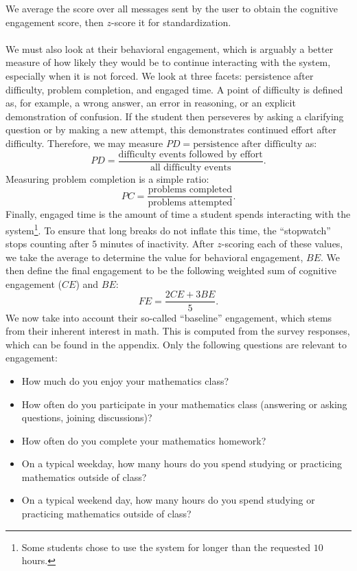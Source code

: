 \documentclass[12pt]{article}
\begin{document}
We average the score over all messages sent by the user to obtain the cognitive engagement score, then $z$-score it for standardization.
\\\\
We must also look at their behavioral engagement, which is arguably a better measure of how likely they would be to continue interacting with the system, especially when it is not forced. We look at three facets: persistence after difficulty, problem completion, and engaged time. A point of difficulty is defined as, for example, a wrong answer, an error in reasoning, or an explicit demonstration of confusion. If the student then perseveres by asking a clarifying question or by making a new attempt, this demonstrates continued effort after difficulty. Therefore, we may measure $PD = \text{persistence after difficulty}$ as:
\[PD = \frac{\text{difficulty events followed by effort}}{\text{all difficulty events}}.\]
Measuring problem completion is a simple ratio:
\[PC = \frac{\text{problems completed}}{\text{problems attempted}}.\]
Finally, engaged time is the amount of time a student spends interacting with the system\footnote{Some students chose to use the system for longer than the requested $10$ hours.}. To ensure that long breaks do not inflate this time, the ``stopwatch'' stops counting after $5$ minutes of inactivity. After $z$-scoring each of these values, we take the average to determine the value for behavioral engagement, $BE$. We then define the final engagement to be the following weighted sum of cognitive engagement ($CE$) and $BE$:
\[FE=\frac{2CE + 3 BE}{5}.\]
We now take into account their so-called ``baseline'' engagement, which stems from their inherent interest in math. This is computed from the survey responses, which can be found in the appendix. Only the following questions are relevant to engagement:
\begin{itemize}
    \item How much do you enjoy your mathematics class?
    \item How often do you participate in your mathematics class (answering or asking questions, joining discussions)?
    \item How often do you complete your mathematics homework?
    \item On a typical weekday, how many hours do you spend studying or practicing mathematics outside of class?
    \item On a typical weekend day, how many hours do you spend studying or practicing mathematics outside of class?
\end{itemize}
\end{document}
